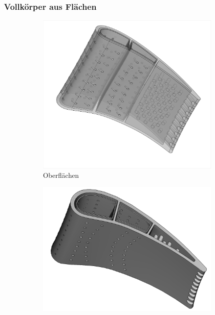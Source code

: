\documentclass[8pt, aspectratio=169]{beamer}
\begin{document}
\begin{frame}
	\frametitle{Vollkörper aus Flächen}
	\vspace{-1.5cm}\hspace{-0.5cm}
	\begin{minipage}{\textwidth}
		\begin{figure}
			\begin{subfigure}{.3\textwidth}
				\centering
				\includegraphics[width=\textwidth, trim={5px 5px 5px 5px}, clip]{../../assets/solid/surfaces2.png}
				\caption{Oberflächen}
			\end{subfigure}
			\begin{subfigure}{.3\textwidth}
				\centering
				\includegraphics[width=\textwidth]{../../assets/solid/solid.png}

\end{subfigure}
\end{figure}
\end{minipage}
\end{frame}
\end{document}
